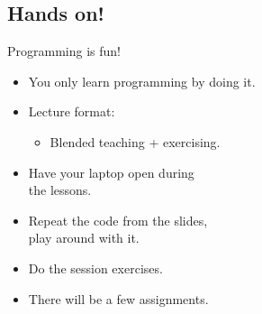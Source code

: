 \documentclass[aspectratio=1610,slidestop]{beamer}
\begin{document}
\subsection{Hands on!}
\begin{pframe}
 Programming is fun!
 \begin{itemize}
  \item You only learn programming by doing it.
  \item Lecture format:
  \begin{itemize}
   \item Blended teaching + exercising.
  \end{itemize}
  \item Have your laptop open during\\
  the lessons.
  \item Repeat the code from the slides,\\
  play around with it.
  \item Do the session exercises.
  \item There will be a few assignments.
 \end{itemize}
\end{pframe}
\end{document}
